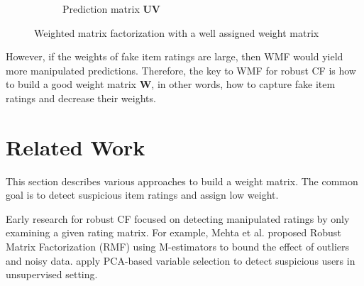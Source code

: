 \documentclass[master,english,final]{kaist-ucs}
\begin{document}
\begin{figure}[h]
\begin{subfigure}[b]{0.3\textwidth}
        \caption{Prediction matrix $\bm{UV}$}
        \label{wmf_good_prediction}
    \end{subfigure}
    \caption{Weighted matrix factorization with a well assigned weight matrix}
    \label{wmf_good}
\end{figure}


However, if the weights of fake item ratings are large, then WMF would yield more manipulated predictions.
Therefore, the key to WMF for robust CF is how to build a good weight matrix $\bm{W}$, in other words, how to capture fake item ratings and decrease their weights.



\chapter{Related Work}
This section describes various approaches to build a weight matrix.
The common goal is to detect suspicious item ratings and assign low weight.


Early research for robust CF focused on detecting manipulated ratings by only examining a given rating matrix.
For example, Mehta et al. \cite{RMF} proposed Robust Matrix Factorization (RMF) using M-estimators to bound the effect of outliers and noisy data.
\cite{LiesAndPropaganda,UnsupervisedShilling,AttackResistant} apply PCA-based variable selection to detect suspicious users in unsupervised setting.
\end{document}
